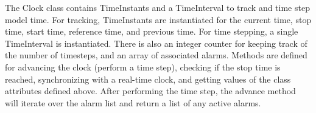 
The Clock class contains TimeInstants and a TimeInterval to track and time
step model time.  For tracking, TimeInstants are instantiated for the
current time, stop time, start time, reference time, and previous time. For
time stepping, a single TimeInterval is instantiated.  There is also an
integer counter for keeping track of the number of timesteps, and an array
of associated alarms.  Methods are defined for advancing the clock (perform
a time step), checking if the stop time is reached, synchronizing with a
real-time clock, and getting values of the class attributes defined above.
After performing the time step, the advance method will iterate over the
alarm list and return a list of any active alarms.
